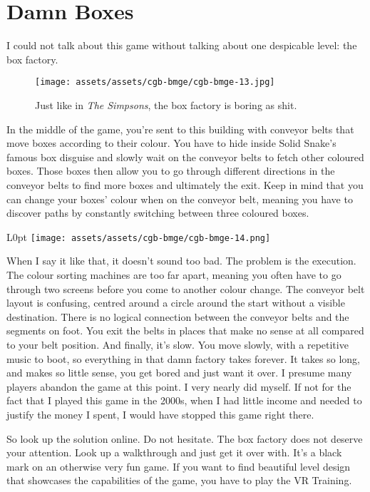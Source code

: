\documentclass{book}
\begin{document}
\FloatBarrier\needspace{10mm}\section*{Damn Boxes}\nopagebreak[4]

I could not talk about this game without talking about one despicable level: the box factory.

\begin{figure}[hbt]
\vskip 10pt
\centering \texttt{[image: assets/assets/cgb-bmge/cgb-bmge-13.jpg]}\par\pagetwodescription Just like in \emph{The Simpsons}, the box factory is boring as shit.
\vskip 6pt
\end{figure}

In the middle of the game, you’re sent to this building with conveyor belts that move boxes according to their colour. You have to hide inside Solid Snake’s famous box disguise and slowly wait on the conveyor belts to fetch other coloured boxes. Those boxes then allow you to go through different directions in the conveyor belts to find more boxes and ultimately the exit. Keep in mind that you can change your boxes’ colour when on the conveyor belt, meaning you have to discover paths by constantly switching between three coloured boxes.

\begin{wrapfigure}{L}{0pt} \texttt{[image: assets/assets/cgb-bmge/cgb-bmge-14.png]}\end{wrapfigure}
When I say it like that, it doesn’t sound too bad. The problem is the execution. The colour sorting machines are too far apart, meaning you often have to go through two screens before you come to another colour change. The conveyor belt layout is confusing, centred around a circle around the start without a visible destination. There is no logical connection between the conveyor belts and the segments on foot. You exit the belts in places that make no sense at all compared to your belt position. And finally, it’s slow. You move slowly, with a repetitive music to boot, so everything in that damn factory takes forever. It takes so long, and makes so little sense, you get bored and just want it over. I presume many players abandon the game at this point. I very nearly did myself. If not for the fact that I played this game in the 2000s, when I had little income and needed to justify the money I spent, I would have stopped this game right there.

So look up the solution online. Do not hesitate. The box factory does not deserve your attention. Look up a walkthrough and just get it over with. It’s a black mark on an otherwise very fun game. If you want to find beautiful level design that showcases the capabilities of the game, you have to play the VR Training.
\end{document}
